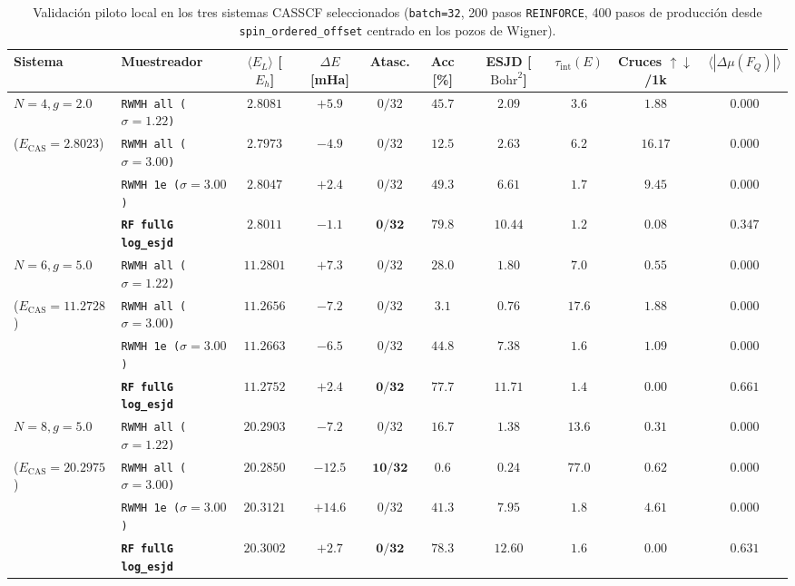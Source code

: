 \documentclass[10pt,a4paper]{article}
\begin{document}
\begin{table}[H]
\centering
\caption{Validación piloto local en los tres sistemas CASSCF seleccionados (\texttt{batch=32}, 200 pasos \texttt{REINFORCE}, 400 pasos de producción desde \texttt{spin\_ordered\_offset} centrado en los pozos de Wigner).}
\label{tab:pilot_3sys}
\begin{adjustbox}{max width=\textwidth}
\begin{tabular}{llcccccccc}
\toprule
\textbf{Sistema} & \textbf{Muestreador} & $\langle E_L \rangle$ [$E_h$] & $\Delta E$ [mHa] & \textbf{Atasc.} & \textbf{Acc [\%]} & \textbf{ESJD} [$\mathrm{Bohr}^2$] & $\tau_{\mathrm{int}}(E)$ & \textbf{Cruces $\uparrow\downarrow$/1k} & $\langle|\Delta\mu(F_Q)|\rangle$ \\
\midrule
$N=4, g=2.0$ & \texttt{RWMH all ($\sigma=1.22$)} & $2.8081$ & $+5.9$ & $0/32$ & $45.7$ & $2.09$ & $3.6$ & $1.88$ & $0.000$ \\
($E_{\mathrm{CAS}}=2.8023$) & \texttt{RWMH all ($\sigma=3.00$)} & $2.7973$ & $-4.9$ & $0/32$ & $12.5$ & $2.63$ & $6.2$ & $\mathbf{16.17}$ & $0.000$ \\
 & \texttt{RWMH 1e ($\sigma=3.00$)} & $2.8047$ & $+2.4$ & $0/32$ & $49.3$ & $6.61$ & $1.7$ & $9.45$ & $0.000$ \\
 & \textbf{\texttt{RF fullG log\_esjd}} & $\mathbf{2.8011}$ & $\mathbf{-1.1}$ & $\mathbf{0/32}$ & $\mathbf{79.8}$ & $\mathbf{10.44}$ & $\mathbf{1.2}$ & $0.08$ & $\mathbf{0.347}$ \\
\midrule
$N=6, g=5.0$ & \texttt{RWMH all ($\sigma=1.22$)} & $11.2801$ & $+7.3$ & $0/32$ & $28.0$ & $1.80$ & $7.0$ & $0.55$ & $0.000$ \\
($E_{\mathrm{CAS}}=11.2728$) & \texttt{RWMH all ($\sigma=3.00$)} & $11.2656$ & $-7.2$ & $0/32$ & $3.1$ & $0.76$ & $17.6$ & $1.88$ & $0.000$ \\
 & \texttt{RWMH 1e ($\sigma=3.00$)} & $11.2663$ & $-6.5$ & $0/32$ & $44.8$ & $7.38$ & $1.6$ & $1.09$ & $0.000$ \\
 & \textbf{\texttt{RF fullG log\_esjd}} & $\mathbf{11.2752}$ & $\mathbf{+2.4}$ & $\mathbf{0/32}$ & $\mathbf{77.7}$ & $\mathbf{11.71}$ & $\mathbf{1.4}$ & $0.00$ & $\mathbf{0.661}$ \\
\midrule
$N=8, g=5.0$ & \texttt{RWMH all ($\sigma=1.22$)} & $20.2903$ & $-7.2$ & $0/32$ & $16.7$ & $1.38$ & $13.6$ & $0.31$ & $0.000$ \\
($E_{\mathrm{CAS}}=20.2975$) & \texttt{RWMH all ($\sigma=3.00$)} & $20.2850$ & $-12.5$ & $\mathbf{10/32}$ & $\mathbf{0.6}$ & $\mathbf{0.24}$ & $\mathbf{77.0}$ & $0.62$ & $0.000$ \\
 & \texttt{RWMH 1e ($\sigma=3.00$)} & $20.3121$ & $+14.6$ & $0/32$ & $41.3$ & $7.95$ & $1.8$ & $\mathbf{4.61}$ & $0.000$ \\
 & \textbf{\texttt{RF fullG log\_esjd}} & $\mathbf{20.3002}$ & $\mathbf{+2.7}$ & $\mathbf{0/32}$ & $\mathbf{78.3}$ & $\mathbf{12.60}$ & $\mathbf{1.6}$ & $0.00$ & $\mathbf{0.631}$ \\
\bottomrule
\end{tabular}
\end{adjustbox}
\end{table}
\end{document}
